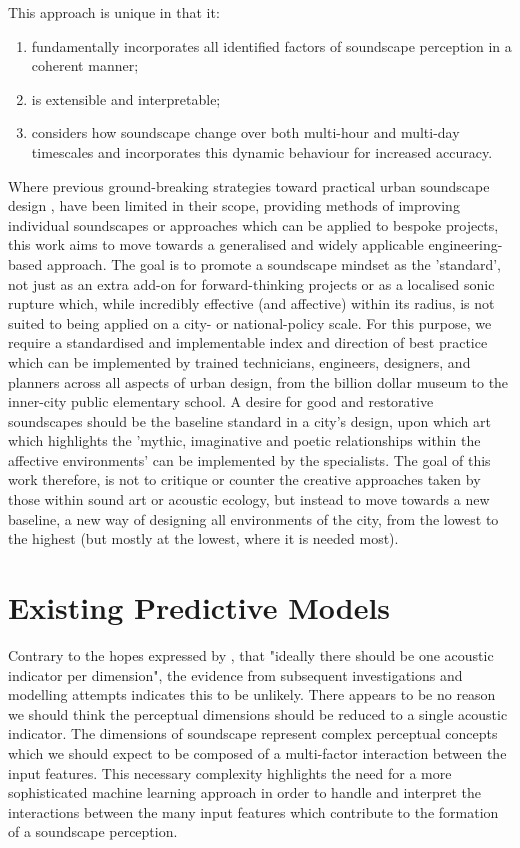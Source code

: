 This approach is unique in that it:
\begin{enumerate}
  \item fundamentally incorporates all identified factors of soundscape perception in a coherent manner;
  \item is extensible and interpretable;
  \item considers how soundscape change over both multi-hour and multi-day timescales and incorporates this dynamic behaviour for increased accuracy.
\end{enumerate}

Where previous ground-breaking strategies toward practical urban soundscape design \citep{Lacey2019Noise}, have been limited in their scope, providing methods of improving individual soundscapes or approaches which can be applied to bespoke projects, this work aims to move towards a generalised and widely applicable engineering-based approach. The goal is to promote a soundscape mindset as the 'standard', not just as an extra add-on for forward-thinking projects or as a localised sonic rupture which, while incredibly effective (and affective) within its radius, is not suited to being applied on a city- or national-policy scale. For this purpose, we require a standardised and implementable index and direction of best practice which can be implemented by trained technicians, engineers, designers, and planners across all aspects of urban design, from the billion dollar museum to the inner-city public elementary school. A desire for good and restorative soundscapes should be the baseline standard in a city's design, upon which art which highlights the 'mythic, imaginative and poetic relationships within the affective environments' \citep{Lacey2019Noise} can be implemented by the specialists. The goal of this work therefore, is not to critique or counter the creative approaches taken by those within sound art or acoustic ecology, but instead to move towards a new baseline, a new way of designing all environments of the city, from the lowest to the highest (but mostly at the lowest, where it is needed most).


\section{Existing Predictive Models}

Contrary to the hopes expressed by \citet{Aletta2014Towards}, that "ideally there should be one acoustic indicator per dimension", the evidence from subsequent investigations and modelling attempts \citep{Lionello2020systematic} indicates this to be unlikely. There appears to be no reason we should think the perceptual dimensions should be reduced to a single acoustic indicator. The dimensions of soundscape represent complex perceptual concepts which we should expect to be composed of a multi-factor interaction between the input features. This necessary complexity  highlights the need for a more sophisticated machine learning approach in order to handle and interpret the interactions between the many input features which contribute to the formation of a soundscape perception.
\citep{Aletta2016Soundscape}

